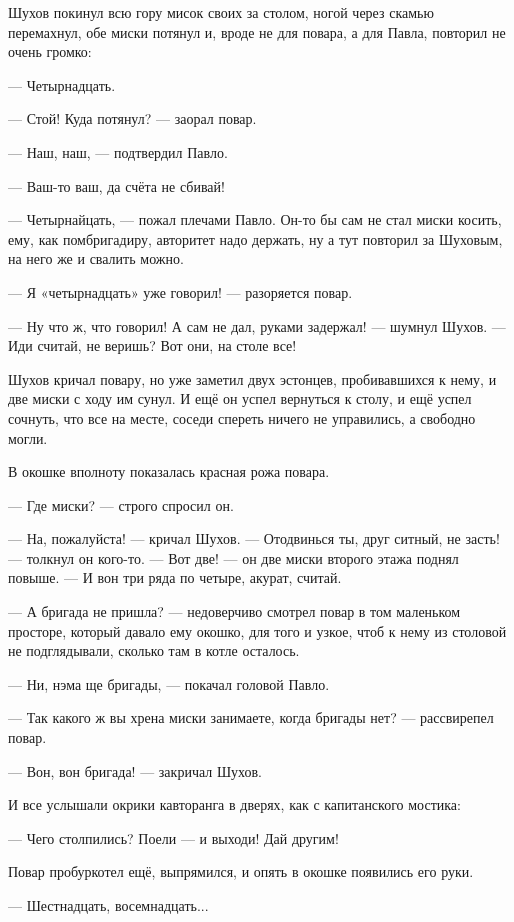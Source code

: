Шухов покинул всю гору мисок своих за столом, ногой через скамью перемахнул, обе миски
потянул и, вроде не для повара, а для Павла, повторил не очень громко:

--- Четырнадцать.

--- Стой! Куда потянул? --- заорал повар.

--- Наш, наш, --- подтвердил Павло.

--- Ваш-то ваш, да счёта не сбивай!

--- Четырнайцать, --- пожал плечами Павло. Он-то бы сам не стал миски косить, ему, как
помбригадиру, авторитет надо держать, ну а тут повторил за Шуховым, на него же и свалить
можно.

--- Я «четырнадцать» уже говорил! --- разоряется повар.

--- Ну что ж, что говорил! А сам не дал, руками задержал! --- шумнул Шухов. --- Иди считай, не веришь?
Вот они, на столе все!

Шухов кричал повару, но уже заметил двух эстонцев, пробивавшихся к нему, и две миски с ходу им
сунул. И ещё он успел вернуться к столу, и ещё успел сочнуть, что все на месте, соседи спереть
ничего не управились, а свободно могли.

В окошке вполноту показалась красная рожа повара.

--- Где миски? --- строго спросил он.

--- На, пожалуйста! --- кричал Шухов. --- Отодвинься ты, друг ситный, не засть! --- толкнул он
кого-то. --- Вот две! --- он две миски второго этажа поднял повыше. --- И вон три ряда по четыре,
акурат, считай.

--- А бригада не пришла? --- недоверчиво смотрел повар в том маленьком просторе, который давало
ему окошко, для того и узкое, чтоб к нему из столовой не подглядывали, сколько там в котле
осталось.

--- Ни, нэма ще бригады, --- покачал головой Павло.

--- Так какого ж вы хрена миски занимаете, когда бригады нет? --- рассвирепел повар.

--- Вон, вон бригада! --- закричал Шухов.

И все услышали окрики кавторанга в дверях, как с капитанского мостика:

--- Чего столпились? Поели --- и выходи! Дай другим!

Повар пробуркотел ещё, выпрямился, и опять в окошке появились его руки.

--- Шестнадцать, восемнадцать...

